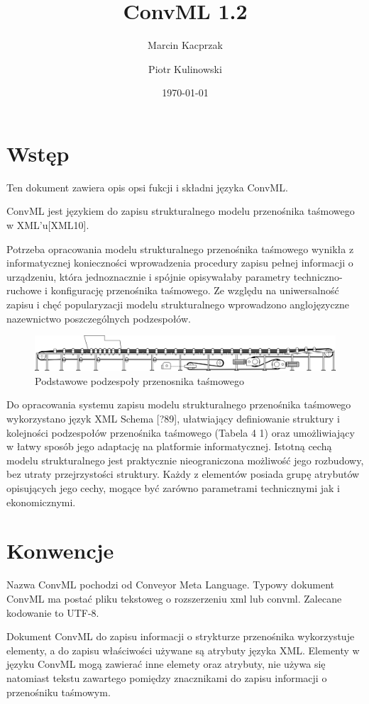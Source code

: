 \documentclass[12pt,a4paper]{article}
\title{ConvML 1.2}
\author{Marcin Kacprzak \and Piotr Kulinowski}
\date{\today}
\begin{document}
\maketitle
\tableofcontents

\section{Wstęp}
Ten dokument zawiera opis opsi fukcji i składni języka ConvML.

ConvML jest językiem do zapisu strukturalnego modelu przenośnika taśmowego w
XML'u[XML10].

Potrzeba opracowania modelu strukturalnego przenośnika taśmowego wynikła z
informatycznej konieczności wprowadzenia procedury zapisu pełnej informacji o
urządzeniu, która jednoznacznie i spójnie opisywałaby parametry
techniczno-ruchowe i konfigurację przenośnika taśmowego.  Ze względu na
uniwersalność zapisu i chęć popularyzacji modelu strukturalnego wprowadzono
anglojęzyczne nazewnictwo poszczególnych podzespołów.

\begin{figure}
\centering
\includegraphics[width=\textwidth]{png/przenosnik}
\caption{Podstawowe podzespoły przenosnika taśmowego}
\label{fig:przenosnik}
\end{figure}

Do opracowania systemu zapisu modelu strukturalnego przenośnika taśmowego
wykorzystano język XML Schema [?89], ułatwiający definiowanie struktury i
kolejności podzespołów przenośnika taśmowego (Tabela 4 1) oraz umożliwiający w
łatwy sposób jego adaptację na platformie informatycznej.  Istotną cechą modelu
strukturalnego jest praktycznie nieograniczona możliwość jego rozbudowy, bez
utraty przejrzystości struktury.  Każdy z elementów posiada grupę atrybutów
opisujących jego cechy, mogące być zarówno parametrami technicznymi jak i
ekonomicznymi.

\section{Konwencje}
Nazwa ConvML pochodzi od Conveyor Meta Language.  Typowy dokument ConvML ma
postać pliku tekstoweg o rozszerzeniu xml lub convml.  Zalecane kodowanie to
UTF-8.

Dokument ConvML do zapisu informacji o strykturze przenośnika wykorzystuje
elementy, a do zapisu właściwości używane są atrybuty języka XML.  Elementy w
języku ConvML mogą zawierać inne elemety oraz atrybuty, nie używa się natomiast
tekstu zawartego pomiędzy znacznikami do zapisu informacji o przenośniku
taśmowym.
\end{document}
